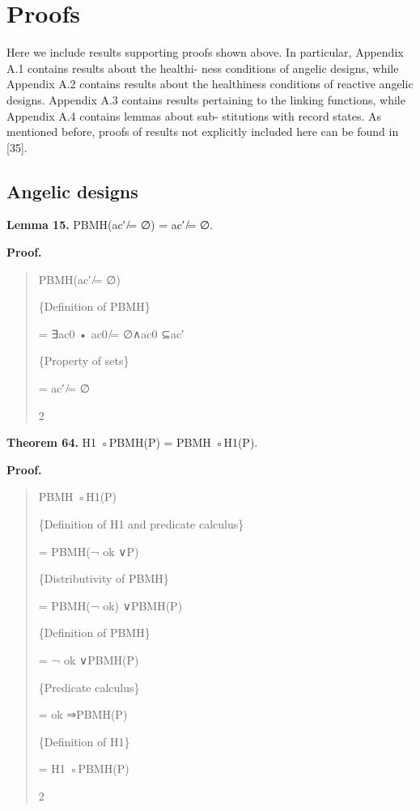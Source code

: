 \documentclass[11pt]{article}
\begin{document}
\appendix
\section{Proofs}
Here we include results supporting proofs shown above. In particular, Appendix A.1 contains results about the healthi- ness conditions of angelic designs, while Appendix A.2 contains results about the healthiness conditions of reactive angelic designs. Appendix A.3 contains results pertaining to the linking functions, while Appendix A.4 contains lemmas about sub- stitutions with record states. As mentioned before, proofs of results not explicitly included here can be found in [35].

\subsection{Angelic designs}
\noindent\textbf{Lemma 15.} PBMH(ac′ ̸= ∅) = ac′ ̸= ∅.


\noindent\textbf{Proof.}


\begin{quote}\small\raggedright
PBMH(ac′ ̸= ∅)
\par
\{Definition of PBMH\}
\par
= ∃ac0 • ac0 ̸= ∅∧ac0 ⊆ac′
\par
\{Property of sets\}
\par
= ac′ ̸= ∅
\par
2
\end{quote}

\noindent\textbf{Theorem 64.} H1 ◦PBMH(P) = PBMH ◦H1(P).


\noindent\textbf{Proof.}


\begin{quote}\small\raggedright
PBMH ◦H1(P)
\par
\{Definition of H1 and predicate calculus\}
\par
= PBMH(¬ ok ∨P)
\par
\{Distributivity of PBMH\}
\par
= PBMH(¬ ok) ∨PBMH(P)
\par
\{Definition of PBMH\}
\par
= ¬ ok ∨PBMH(P)
\par
\{Predicate calculus\}
\par
= ok ⇒PBMH(P)
\par
\{Definition of H1\}
\par
= H1 ◦PBMH(P)
\par
2
\end{quote}
\end{document}
